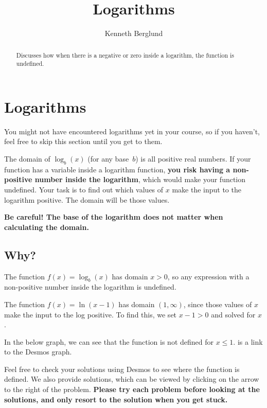 \documentclass{ximera}
\title{ Logarithms}
\author{Kenneth Berglund}
\begin{document}
\begin{abstract}
Discusses how when there is a negative or zero inside a logarithm, the function is undefined. 
\end{abstract}
\maketitle

\section{Logarithms}
You might not have encountered logarithms yet in your course, so if you haven’t, feel free to skip this section until you get to them.

The domain of $\log_b(x)$ (for any base $b$) is all positive real numbers. If your function has a variable inside a logarithm function, \textbf{you risk having a non-positive number inside the logarithm}, which would make your function undefined. Your task is to find out which values of $x$ make the input to the logarithm positive. The domain will be those values.

\textbf{Be careful! The base of the logarithm does not matter when calculating the domain.}

\subsection{Why?}
The function $f(x) = \log_b(x)$ has domain $x > 0$, so any expression with a non-positive number inside the logarithm is undefined. 

\begin{example}
The function $f(x) = \ln(x - 1)$ has domain $(1, \infty)$, since those values of $x$ make the input to the log positive. To find this, we set $x - 1 > 0$ and solved for $x$.

In the below graph, we can see that the function is not defined for $x \le 1$.  is a link to the Desmos graph. 
\begin{center}
\end{center}
\end{example}
Feel free to check your solutions using Desmos to see where the function is defined. We also provide solutions, which can be viewed by clicking on the arrow to the right of the problem. \textbf{Please try each problem before looking at the solutions, and only resort to the solution when you get stuck.} 
\end{document}
